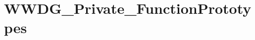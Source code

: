 \hypertarget{group___w_w_d_g___private___function_prototypes}{\section{W\-W\-D\-G\-\_\-\-Private\-\_\-\-Function\-Prototypes}
\label{group___w_w_d_g___private___function_prototypes}
}
